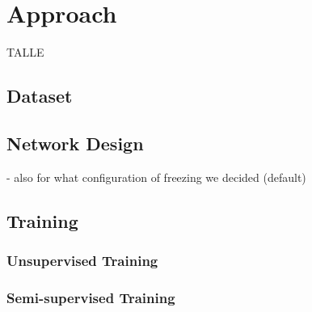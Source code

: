 \section{Approach}
TALLE
\subsection{Dataset}

\subsection{Network Design}
- also for what configuration of freezing we decided (default)
\subsection{Training}

\subsubsection{Unsupervised Training}

\subsubsection{Semi-supervised Training}